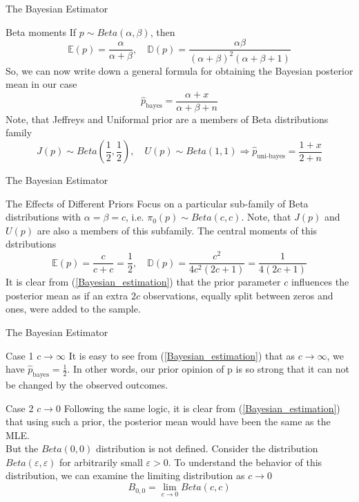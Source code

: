 \documentclass{beamer}
\begin{document}
\begin{frame}{The Bayesian Estimator}
    \begin{block}{Beta moments}
        If $p \sim Beta(\alpha, \beta)$, then
        \[\mathbb{E}(p) = \dfrac{\alpha}{\alpha + \beta}, \quad \mathbb{D}(p) = \dfrac{\alpha\beta}{(\alpha + \beta)^2(\alpha + \beta+1)}\]
        So, we can now write down a general formula for obtaining the Bayesian posterior mean in our case
        \begin{equation}\label{Bayesian_estimation}
            \hat{p}_{\text{bayes}} = \dfrac{\alpha + x}{\alpha + \beta + n}
        \end{equation}
        Note, that Jeffreys and Uniformal prior are a members of Beta distributions family
        \[J(p) \sim Beta\left(\frac{1}{2}, \frac{1}{2}\right), \quad U(p) \sim Beta(1, 1) \Rightarrow \hat{p}_{\text{uni-bayes}} = \dfrac{1 + x}{2 + n}\]
    \end{block}
\end{frame}

\begin{frame}{The Bayesian Estimator}
    \begin{block}{The Effects of Different Priors}
        Focus on a particular sub-family of Beta distributions with $\alpha=\beta=c$, i.e. $\pi_0(p) \sim Beta(c, c)$. Note, that $J(p)$ and $U(p)$ are also a members of this subfamily. The central moments of this dstributions
        \begin{equation}\label{beta_moments}
            \mathbb{E}(p) = \dfrac{c}{c + c} = \dfrac{1}{2}, \quad \mathbb{D}(p) = \dfrac{c^2}{4c^2(2c + 1)} = \dfrac{1}{4(2c + 1)}
        \end{equation}
        It is clear from (\ref{Bayesian_estimation}) that the prior parameter $c$ influences the posterior mean as if an extra $2c$ observations, equally split between zeros and ones, were added to the sample. 
    \end{block}
\end{frame}

\begin{frame}{The Bayesian Estimator}
    \begin{block}{Case 1 $c \to \infty$}
        It is easy to see from (\ref{Bayesian_estimation}) that as $c \to \infty$, we have $\hat{p}_{\text{bayes}} = \frac{1}{2}$. In other words, our prior
opinion of p is so strong that it can not be changed by the observed outcomes.
    \end{block}
    
    \begin{block}{Case 2 $c \to 0$}
        Following the same logic, it is clear from (\ref{Bayesian_estimation}) that using such a prior, the posterior mean would have been the same as the MLE. \\ 
        But the $Beta(0, 0)$  distribution is not defined. Consider the distribution $Beta(\varepsilon, \varepsilon)$ for arbitrarily small $\varepsilon > 0$. To understand the behavior of this
        distribution, we can examine the limiting distribution as $c \to 0$
        \[B_{0, 0} = \lim\limits_{c \to 0}Beta(c, c)\]
    \end{block}
\end{frame}
\end{document}
